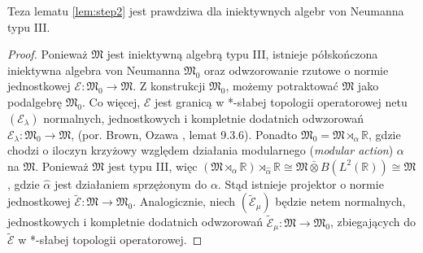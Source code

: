 \begin{Lemma}
Teza lematu \ref{lem:step2} jest prawdziwa dla iniektywnych algebr von Neumanna
typu III.
\end{Lemma}
\begin{proof}
Ponieważ $\mathfrak{M}$ jest iniektywną algebrą typu III,
istnieje półskończona iniektywna algebra von Neumanna
$\mathfrak{M}_{0}$ oraz odwzorowanie rzutowe o normie jednostkowej
$\mathcal{E}: \mathfrak{M}_{0} \rightarrow \mathfrak{M}$.
Z konstrukcji $\mathfrak{M}_{0}$, możemy potraktować
$\mathfrak{M}$ jako podalgebrę $\mathfrak{M}_{0}$.
Co więcej, $\mathcal{E}$ jest granicą w *-słabej topologii operatorowej
netu $(\mathcal{E}_{\lambda})$ normalnych, jednostkowych i kompletnie dodatnich
odwzorowań $\mathcal{E}_{\lambda} : \mathfrak{M}_{0} \rightarrow \mathfrak{M}$,
(por. Brown, Ozawa \cite{Brown2008}, lemat 9.3.6).
Ponadto
$\mathfrak{M}_{0} = \mathfrak{M} \rtimes_{\alpha} \mathbb{R}$,
gdzie chodzi o iloczyn krzyżowy względem działania modularnego
(\emph{modular action}) $\alpha$ na $\mathfrak{M}$.
Ponieważ $\mathfrak{M}$ jest typu III, więc
$(\mathfrak{M} \rtimes_{\alpha} \mathbb{R}) \rtimes_{\hat{\alpha}} \mathbb{R}
\cong \mathfrak{M} \bar{\otimes} B(L^{2}(\mathbb{R})) \cong \mathfrak{M}$,
gdzie $\hat{\alpha}$ jest działaniem sprzężonym do $\alpha$.
Stąd istnieje projektor o normie jednostkowej
$\tilde{\mathcal{E}} : \mathfrak{M} \rightarrow \mathfrak{M}_{0}$.
Analogicznie, niech $(\tilde{\mathcal{E}}_{\mu})$
będzie netem normalnych, jednostkowych i kompletnie dodatnich odwzorowań
$\tilde{\mathcal{E}}_{\mu}: \mathfrak{M} \rightarrow \mathfrak{M}_{0}$,
zbiegających do $\tilde{\mathcal{E}}$ w *-słabej topologii operatorowej.


\end{proof}
